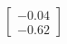 \documentclass[preview]{standalone}
\begin{document}
\begin{align*}
\begin{bmatrix} -0.04 \\ -0.62 \end{bmatrix}
\end{align*}
\end{document}
